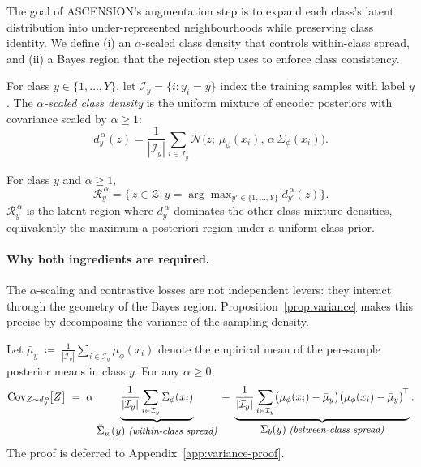 The goal of ASCENSION's augmentation step is to expand each
class's latent distribution into under-represented
neighbourhoods while preserving class identity. We define (i) an $\alpha$-scaled class
density that controls within-class spread, and  (ii) a Bayes region
that the rejection step uses to enforce class consistency.

\begin{definition}
\label{def:alpha-density}
For class $y \in \{1,\ldots,Y\}$, let
$\mathcal{I}_y = \{i : y_i = y\}$ index the training samples
with label $y$. The \emph{$\alpha$-scaled class density} is the
uniform mixture of encoder posteriors with covariance scaled by
$\alpha \geq 1$:
\begin{equation}
d_y^{\,\alpha}(z)
= \frac{1}{|\mathcal{I}_y|}
  \sum_{i \in \mathcal{I}_y}
    \mathcal{N}\!\bigl(z;\,\mu_\phi(x_i),\,\alpha\,\Sigma_\phi(x_i)\bigr).
\label{eq:alpha-density}
\end{equation}
\end{definition}

\begin{definition}
\label{def:bayes-region}
For class $y$ and $\alpha \geq 1$,
\begin{equation}
\mathcal{R}_y^{\,\alpha}
= \bigl\{\,z \in \mathcal{Z} :
  y = \arg\max\nolimits_{y' \in \{1,\ldots,Y\}}
       d_{y'}^{\,\alpha}(z)\bigr\}.
\end{equation}
$\mathcal{R}_y^{\,\alpha}$ is the latent region where
$d_y^{\,\alpha}$ dominates the other class mixture densities,
equivalently the maximum-a-posteriori region under a uniform
class prior.
\end{definition}

\paragraph{Why both ingredients are required.}
The $\alpha$-scaling and contrastive losses are not independent
levers: they interact through the geometry of the Bayes
region. Proposition~\ref{prop:variance} makes this precise by decomposing
the variance of the sampling density.

\begin{proposition}
\label{prop:variance}
Let $\bar\mu_y \;\coloneqq\; \tfrac{1}{|\mathcal{I}_y|}
\sum_{i\in\mathcal{I}_y}\mu_\phi(x_i)$ denote the empirical
mean of the per-sample posterior means in class $y$.
For any $\alpha \geq 0$,
\begin{equation}
\mathrm{Cov}_{Z \sim d_y^{\,\alpha}}\!\bigl[Z\bigr]
\;=\;
\alpha\,
\underbrace{
\frac{1}{|\mathcal{I}_y|}\sum_{i\in\mathcal{I}_y}\Sigma_\phi(x_i)
}_{\displaystyle \bar\Sigma_w(y)\;\text{\itshape\small (within-class spread)}}
\;+\;
\underbrace{
\frac{1}{|\mathcal{I}_y|}\sum_{i\in\mathcal{I}_y}
\bigl(\mu_\phi(x_i)-\bar\mu_y\bigr)\bigl(\mu_\phi(x_i)-\bar\mu_y\bigr)^{\!\top}
}_{\displaystyle \Sigma_b(y)\;\text{\itshape\small (between-class spread)}}.
\label{eq:var-decomp}
\end{equation}
The proof is deferred to
Appendix~\ref{app:variance-proof}.
\end{proposition}

